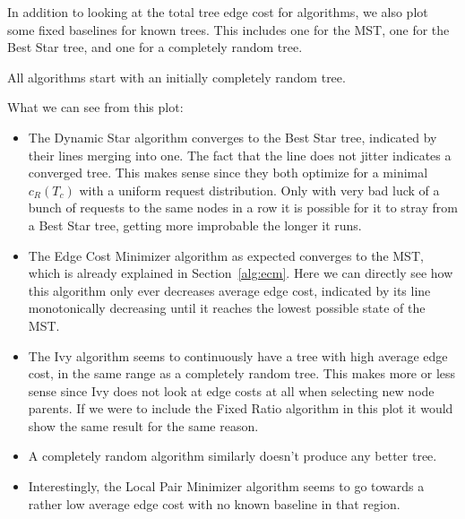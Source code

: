 \documentclass[a4paper, oneside]{discothesis}
\begin{document}
In addition to looking at the total tree edge cost for algorithms, we also plot some fixed baselines for known trees. This includes one for the MST, one for the Best Star tree, and one for a completely random tree.

All algorithms start with an initially completely random tree.


What we can see from this plot:
\begin{itemize}
\item The Dynamic Star algorithm converges to the Best Star tree, indicated by their lines merging into one. The fact that the line does not jitter indicates a converged tree. This makes sense since they both optimize for a minimal $c_R(T_c)$ with a uniform request distribution. Only with very bad luck of a bunch of requests to the same nodes in a row it is possible for it to stray from a Best Star tree, getting more improbable the longer it runs.
\item The Edge Cost Minimizer algorithm as expected converges to the MST, which is already explained in Section~\ref{alg:ecm}. Here we can directly see how this algorithm only ever decreases average edge cost, indicated by its line monotonically decreasing until it reaches the lowest possible state of the MST.
\item The Ivy algorithm seems to continuously have a tree with high average edge cost, in the same range as a completely random tree. This makes more or less sense since Ivy does not look at edge costs at all when selecting new node parents. If we were to include the Fixed Ratio algorithm in this plot it would show the same result for the same reason.
\item A completely random algorithm similarly doesn't produce any better tree.
\item Interestingly, the Local Pair Minimizer algorithm seems to go towards a rather low average edge cost with no known baseline in that region.
\end{itemize}
\end{document}
